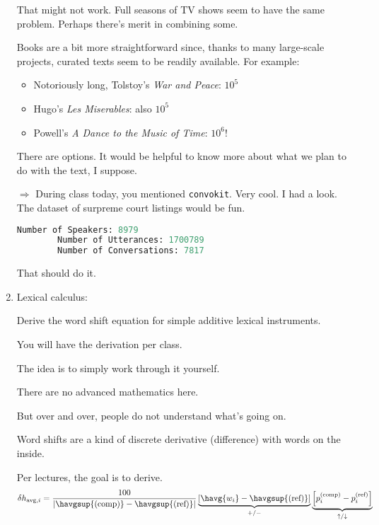 \begin{enumerate}
That might not work. Full seasons of TV shows seem to have the same problem. Perhaps there's merit in combining some.

Books are a bit more straightforward since, thanks to many large-scale projects, curated texts seem to be readily available. For example:

\begin{itemize}
	\item Notoriously long, Tolstoy's \textit{War and Peace}: $10^5$
	\item Hugo's \textit{Les Miserables}: also $10^5$
	\item Powell's 	\textit{A Dance to the Music of Time}: $10^6$!
\end{itemize}

There are options. It would be helpful to know more about what we plan to do with the text, I suppose.

$\Rightarrow$ During class today, you mentioned \texttt{convokit}. Very cool. I had a look. The dataset of surpreme court listings would be fun.
	
	\begin{lstlisting}[language=python]
		Number of Speakers: 8979
		Number of Utterances: 1700789
		Number of Conversations: 7817
	\end{lstlisting}
	
	That should do it. 
	
	
   \solutionend

\item

  Lexical calculus:

  Derive the word shift equation for simple additive lexical instruments.

  You will have the derivation per class.

  The idea is to simply work through it yourself.

  There are no advanced mathematics here.

  But over and over, people do not understand what's going on.

  Word shifts are a kind of discrete derivative (difference) with words on the inside.

  Per lectures, the goal is to derive.
  $$
  \delta h_{\textnormal{avg},i}
  =
  \frac{100}{
    \left|
    \havgsup{(\rm comp)} - \havgsup{(\textnormal{ref})}
    \right|
  }
  \underbrace{
    \left[
      \havg{w_{i}} - \havgsup{(\textnormal{ref})}
      \right]
  }_{+/-}
  \underbrace{
    \left[
      p_{i}^{(\textnormal{comp})} - p_{i}^{(\textnormal{ref})}
      \right]
  }_{\uparrow/\downarrow}
  $$


\end{enumerate}

